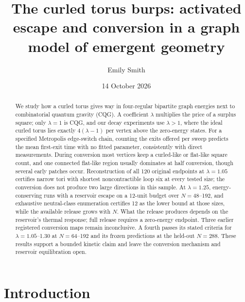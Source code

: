 \documentclass[aps,pre,10pt,twocolumn,superscriptaddress,nofootinbib]{revtex4-2}
\begin{document}
\title{The curled torus burps: activated escape and conversion in a graph model of emergent geometry}

\author{Emily Smith}

\date{14 October 2026}

\begin{abstract}
We study how a curled torus gives way in four-regular bipartite graph energies next to combinatorial
quantum gravity (CQG). A coefficient $\lambda$ multiplies the price of a surplus square; only
$\lambda=1$ is CQG, and our decay experiments use $\lambda>1$, where the ideal curled torus lies exactly
$4(\lambda-1)$ per vertex above the zero-energy states. For a specified Metropolis edge-switch chain,
counting the exits offered per sweep predicts the mean first-exit time with no fitted parameter,
consistently with direct measurements. During conversion most vertices keep a curled-like or
flat-like square count, and one connected flat-like region usually dominates at half conversion,
though several early patches occur. Reconstruction of all 120 original endpoints at
$\lambda=1.05$ certifies narrow tori with shortest noncontractible loop six at every tested size;
the conversion does not produce two large directions in this sample. At $\lambda=1.25$, energy-conserving runs with a reservoir
escape on a 12-unit budget over $N=48$--192, and exhaustive neutral-class enumeration certifies 12 as
the lower bound at those sizes, while the available release grows with $N$. What the release produces
depends on the reservoir's thermal response; full release requires a zero-energy endpoint. Three earlier
registered conversion maps remain inconclusive. A fourth passes its stated criteria for
$\lambda=1.05$--1.30 at $N=64$--192 and its frozen predictions at the held-out $N=288$. These results support a bounded kinetic claim and
leave the conversion mechanism and reservoir equilibration open.
\end{abstract}

\maketitle

\section{Introduction}
\end{document}
